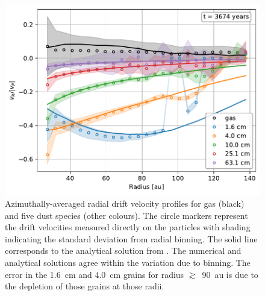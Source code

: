 \documentclass[fleqn,usenatbib]{mnras}
\begin{document}
\begin{figure}
   \begin{center}
      \includegraphics[width=\columnwidth]{figs/radialdrift.pdf}
      \caption{Azimuthally-averaged radial drift velocity profiles for gas
      (black) and five dust species (other colours). The circle markers
      represent the drift velocities measured directly on the particles with
      shading indicating the standard deviation from radial binning. The solid
      line corresponds to the analytical solution from
      \citet{Dipierro2018MNRAS.479.4187D}. The numerical and analytical
      solutions agree within the variation due to binning. The error in the
      1.6~cm and 4.0~cm grains for radius \(\gtrsim\)~90~au is due to the
      depletion of those grains at those radii.%
      \label{fig:radialdrift}}
   \end{center}
\end{figure}
\end{document}
